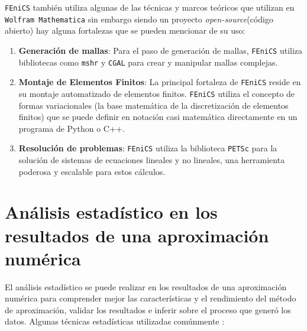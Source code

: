 \documentclass[a4paper]{article}
\begin{document}
\texttt{FEniCS} también utiliza algunas de las técnicas y marcos teóricos que utilizan en \texttt{Wolfram Mathematica} sin embargo siendo un proyecto \textit{open-source}(código abierto) hay alguna fortalezas que se pueden mencionar de su uso:
\begin{enumerate}
  \item \textbf{Generación de mallas}: Para el paso de generación de mallas, \texttt{FEniCS} utiliza bibliotecas como \texttt{mshr} y \texttt{CGAL} para crear y manipular mallas complejas.
  \item \textbf{Montaje de Elementos Finitos}: La principal fortaleza de \texttt{FEniCS} reside en su montaje automatizado de elementos finitos. \texttt{FEniCS} utiliza el concepto de formas variacionales (la base matemática de la discretización de elementos finitos) que se puede definir en notación casi matemática directamente en un programa de Python o C++.
  \item \textbf{Resolución de problemas}: \texttt{FEniCS} utiliza la biblioteca \texttt{PETSc} para la solución de sistemas de ecuaciones lineales y no lineales, una herramienta poderosa y escalable para estos cálculos.
\end{enumerate}

\section{Análisis estadístico en los resultados de una aproximación numérica}

El análisis estadístico se puede realizar en los resultados de una aproximación numérica para comprender mejor las características y el rendimiento del método de aproximación, validar los resultados e inferir sobre el proceso que generó los datos. Algunas técnicas estadísticas utilizadas comúnmente :
\end{document}
